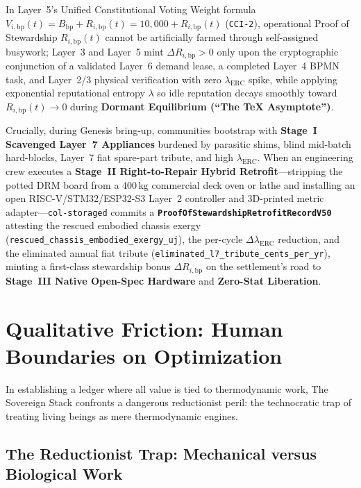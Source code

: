 In Layer~5's Unified Constitutional Voting Weight formula $V_{i,\mathrm{bp}}(t) = B_{\mathrm{bp}} + R_{i,\mathrm{bp}}(t) = 10{,}000 + R_{i,\mathrm{bp}}(t)$ (\texttt{CCI-2}), operational Proof of Stewardship $R_{i,\mathrm{bp}}(t)$ cannot be artificially farmed through self-assigned busywork; Layer~3 and Layer~5 mint $\Delta R_{i,\mathrm{bp}} > 0$ only upon the cryptographic conjunction of a validated Layer~6 demand lease, a completed Layer~4 BPMN task, and Layer~2/3 physical verification with zero $\lambda_{\mathrm{ERC}}$ spike, while applying exponential reputational entropy $\lambda$ so idle reputation decays smoothly toward $R_{i,\mathrm{bp}}(t) \to 0$ during \textbf{Dormant Equilibrium (``The \TeX{} Asymptote'')}.

Crucially, during Genesis bring-up, communities bootstrap with \textbf{Stage~I Scavenged Layer~7 Appliances} burdened by parasitic shims, blind mid-batch hard-blocks, Layer~7 fiat spare-part tribute, and high $\lambda_{\mathrm{ERC}}$. When an engineering crew executes a \textbf{Stage~II Right-to-Repair Hybrid Retrofit}---stripping the potted DRM board from a $400\,\mathrm{kg}$ commercial deck oven or lathe and installing an open RISC-V/STM32/ESP32-S3 Layer~2 controller and 3D-printed metric adapter---\texttt{col-storaged} commits a \textbf{\texttt{ProofOfStewardshipRetrofitRecordV50}} attesting the rescued embodied chassis exergy (\texttt{rescued\_chassis\_embodied\_exergy\_uj}), the per-cycle $\Delta \lambda_{\mathrm{ERC}}$ reduction, and the eliminated annual fiat tribute (\texttt{eliminated\_l7\_tribute\_cents\_per\_yr}), minting a first-class stewardship bonus $\Delta R_{i,\mathrm{bp}}$ on the settlement's road to \textbf{Stage~III Native Open-Spec Hardware} and \textbf{Zero-Stat Liberation}.

\section{Qualitative Friction: Human Boundaries on Optimization}
\label{sec:l3-friction}

In establishing a ledger where all value is tied to thermodynamic work, The Sovereign Stack confronts a dangerous reductionist peril: the technocratic trap of treating living beings as mere thermodynamic engines.

\subsection{The Reductionist Trap: Mechanical versus Biological Work}

